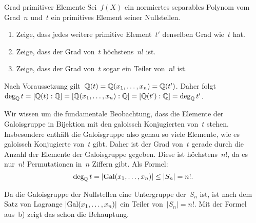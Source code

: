 \documentclass{algblatt}
\begin{document}
\begin{aufgabe}{Grad primitiver Elemente}
Sei~$f(X)$ ein normiertes separables Polynom vom Grad~$n$ und~$t$ ein
primitives Element seiner Nullstellen.
\begin{enumerate}
\item Zeige, dass jedes weitere primitive Element~$t'$ denselben Grad wie~$t$
hat.
\item Zeige, dass der Grad von~$t$ höchstens~$n!$ ist.
\item Zeige, dass der Grad von~$t$ sogar ein Teiler von~$n!$ ist.
\end{enumerate}

\begin{loesungE}
\item Nach Voraussetzung gilt~$\mathbb{Q}(t) = \mathbb{Q}(x_1,\ldots,x_n) = \mathbb{Q}(t')$. Daher
folgt $\deg_{\mathbb{Q}} t = [\mathbb{Q}(t):\mathbb{Q}] = [\mathbb{Q}(x_1,\ldots,x_n):\mathbb{Q}] =
[\mathbb{Q}(t'):\mathbb{Q}] = \deg_{\mathbb{Q}} t'$.

\item Wir wissen um die fundamentale Beobachtung, dass die Elemente der
Galoisgruppe in Bijektion mit den galoissch Konjugierten von~$t$ stehen.
Insbesondere enthält die Galoisgruppe also genau so viele Elemente, wie es
galoissch Konjugierte von~$t$ gibt. Daher ist der Grad von~$t$ gerade durch
die Anzahl der Elemente der Galoisgruppe gegeben. Diese ist höchstens~$n!$, da
es nur~$n!$ Permutationen in~$n$ Ziffern gibt. Als Formel:
\[ \deg_{\mathbb{Q}} t = |\mathrm{Gal}(x_1,\ldots,x_n)| \leq |S_n| = n!. \]

\item Da die Galoisgruppe der Nullstellen eine Untergruppe der~$S_n$ ist, ist
nach dem Satz von Lagrange $|\mathrm{Gal}(x_1,\ldots,x_n)|$ ein Teiler von~$|S_n| =
n!$. Mit der Formel aus~b) zeigt das schon die Behauptung.
\end{loesungE}
\end{aufgabe}
\end{document}

